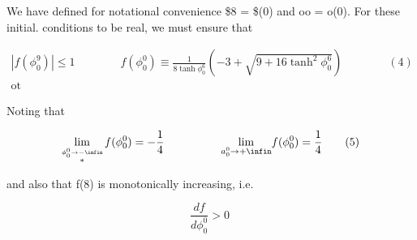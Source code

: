 \documentclass{article}
\begin{document}
We have defined for notational convenience \$8 = \$(0) and oo = o(0). For these initial.
conditions to be real, we must ensure that


\begin{equation}
\begin{array} { c } { | f ( \phi _ { 0 } ^ { 9 } ) | \leq 1 \qquad \qquad f ( \phi _ { 0 } ^ { 0 } ) \equiv \frac { 1 } { 8 \operatorname { t a n h } \phi _ { 0 } ^ { 6 } } \left ( - 3 + \sqrt { 9 + 1 6 \operatorname { t a n h } ^ { 2 } \phi _ { 0 } ^ { 6 } } \right ) \qquad \qquad ( 4 ) } \\ { \mathrm { o t } } \end{array}
\end{equation}


Noting that


\begin{equation}
\operatorname* { l i m } _ { \stackrel { \phi _ { 0 } ^ { 0 } \rightarrow - \infin } { * } } f ( \phi _ { 0 } ^ { 0 } ) = - \frac { 1 } { 4 } \qquad \qquad \quad \underset { a _ { 0 } ^ { 0 } \rightarrow + \infin } { \operatorname* { l i m } } f ( \phi _ { 0 } ^ { 0 } ) = \frac { 1 } { 4 } \qquad ( 5 )
\end{equation}


and also that f(8) is monotonically increasing, i.e.


\begin{equation}
\frac { d f } { d \phi _ { 0 } ^ { 0 } } > 0 ~
\end{equation}
\end{document}

